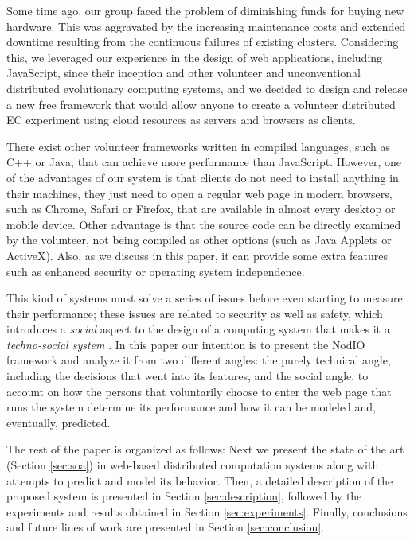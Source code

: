 \documentclass[journal,onecolumn]{IEEEtran}
\begin{document}
Some time ago, our group faced the problem of diminishing funds for
buying new hardware. This was aggravated by the increasing maintenance costs and
extended downtime resulting from the continuous failures of existing
clusters.
Considering this, we leveraged our experience in the design of web
applications, including JavaScript, since their inception and other
volunteer and
unconventional distributed evolutionary computing systems, and we
decided to design and release a new free framework that would allow anyone to
create a volunteer distributed EC experiment using cloud resources as
servers and browsers as clients.

There exist other volunteer frameworks written in compiled languages, such as C++ or Java, that can achieve more performance than JavaScript. However, one of the advantages of our system is that clients do not need to install anything in their machines, they just need to open a regular web page  
in modern browsers, such as Chrome, Safari or Firefox, that are available in almost every desktop or mobile device. Other advantage is that the source code can be directly examined by the volunteer, not being compiled as other options (such as Java Applets or ActiveX). Also, as we discuss in this paper, it can provide some extra features such as enhanced security or operating system independence.

This kind of systems must solve a series of issues before even starting to 
measure their performance; these issues are related to security as well as
safety, which introduces a {\em social} aspect to the design of a
computing system that makes it a {\em techno-social system}
\cite{vespignani2009predicting}. In this paper our intention is to
present the {\sf NodIO} framework and analyze it from two different
angles: the purely technical angle, including the decisions that went
into its features, and the social angle, to account on how the persons
that voluntarily choose to enter the web page that runs the system
determine its performance and how it can be modeled and, eventually,
predicted.

The rest of the paper is organized as follows: Next we present the
state of the art (Section \ref{sec:soa}) in web-based distributed
computation systems along with attempts to predict and model its behavior. 
Then, a detailed description of the proposed system is presented
in Section \ref{sec:description}, followed by the experiments and 
results obtained in Section \ref{sec:experiments}.
Finally, conclusions and future lines of work are presented in Section
\ref{sec:conclusion}. 
\end{document}
